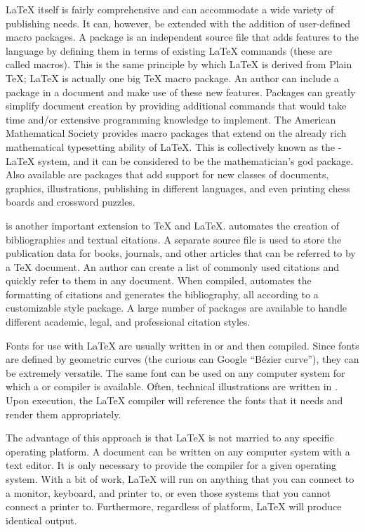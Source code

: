 \LaTeX{} itself is fairly comprehensive and can accommodate a wide
variety of publishing needs.  It can, however, be extended with the
addition of user-defined macro packages.  A package is an independent
source file that adds features to the language by defining them in
terms of existing \LaTeX{} commands (these are called macros).  This
is the same principle by which \LaTeX{} is derived from Plain \TeX{};
\LaTeX{} is actually one big \TeX{} macro package.  An author can
include a package in a document and make use of these new features.
Packages can greatly simplify document creation by providing
additional commands that would take time and/or extensive programming
knowledge to implement.  The American Mathematical Society provides
macro packages that extend on the already rich mathematical
typesetting ability of \LaTeX{}.  This is collectively known as the
\AmS-\LaTeX{} system, and it can be considered to be the
mathematician's god package.  Also available are packages that add
support for new classes of documents, graphics, illustrations,
publishing in different languages, and even printing chess boards and
crossword puzzles.

\BibTeX{} is another important extension to \TeX{} and \LaTeX{}.
\BibTeX{} automates the creation of bibliographies and textual
citations.  A separate source file is used to store the publication
data for books, journals, and other articles that can be referred to
by a \TeX{} document.  An author can create a list of commonly used
citations and quickly refer to them in any document.  When compiled,
\BibTeX{} automates the formatting of citations and generates the
bibliography, all according to a customizable style package.  A large
number of \BibTeX{} packages are available to handle different
academic, legal, and professional citation styles.

Fonts for use with \LaTeX{} are usually written in \MF{} or \MP{} and
then compiled.  Since fonts are defined by geometric curves (the
curious can Google ``B\'ezier curve''), they can be extremely
versatile.  The same font can be used on any computer system for which
a \MF{} or \MP{} compiler is available.  Often, technical
illustrations are written in \MP{}.  Upon execution, the \LaTeX{}
compiler will reference the fonts that it needs and render them
appropriately.

The advantage of this approach is that \LaTeX{} is not married to any
specific operating platform.  A \texext{} document can be written on
any computer system with a text editor.  It is only necessary to
provide the compiler for a given operating system.  With a bit of
work, \LaTeX{} will run on anything that you can connect to a monitor,
keyboard, and printer to, or even those systems that you cannot
connect a printer to.  Furthermore, regardless of platform, \LaTeX{}
will produce identical output.

